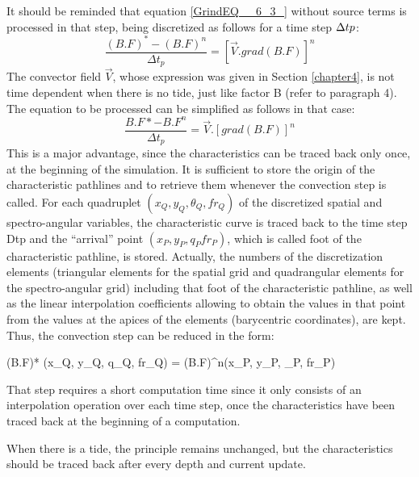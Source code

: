  It should be reminded that equation \eqref{GrindEQ__6_3_} without source terms is processed in that step, being discretized as follows for a time step $\Delta t p$:
\begin{equation} \label{GrindEQ__6_7_}
\frac{(B.F)^*-(B.F)^{n} }{\Delta t_{p} } =\left[\vec{V}.grad(B.F)\right]^{n}
\end{equation}
The convector field $\vec{V}$, whose expression was given in Section \ref{chapter4}, is not time dependent when there is no tide, just like factor B (refer to paragraph 4). The equation to be processed can be simplified as follows in that case:
\begin{equation} \label{GrindEQ__6_8_}
\frac{B.F*-B.F^{n} }{\Delta t_{p} } =\vec{V}.\left[grad(B.F)\right]^{n}
\end{equation}
This is a major advantage, since the characteristics can be traced back only once, at the beginning of the simulation. It is sufficient to store the origin of the characteristic pathlines and to retrieve them whenever the convection step is called. For each quadruplet $(x_{Q}, y_{Q}, \theta_{Q}, fr_{Q})$ of the discretized spatial and spectro-angular variables, the characteristic curve is traced back to the time step Dtp and the ``arrival'' point $(x_{P}, y_{P}, q_{P} fr_{P})$, which is called foot of the characteristic pathline, is stored. Actually, the numbers of the discretization elements (triangular elements for the spatial grid and quadrangular elements for the spectro-angular grid) including that foot of the characteristic pathline, as well as the linear interpolation coefficients allowing to obtain the values in that point from the values at the apices of the elements (barycentric coordinates), are kept. Thus, the convection step can be reduced in the form:

\bequ \label{eq:convstep}
(B.F)* (x_{Q}, y_{Q}, q_{Q}, fr_{Q}) = (B.F)^{n}(x_{P}, y_{P}, \theta_{P}, fr_{P}) 
\eequ

That step requires a short computation time since it only consists of an interpolation operation over each time step, once the characteristics have been traced back at the beginning of a computation.

 When there is a tide, the principle remains unchanged, but the characteristics should be traced back after every depth and current update.

